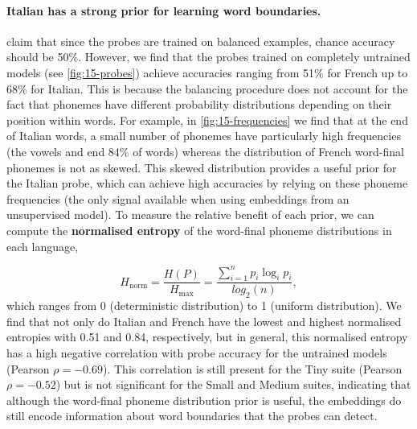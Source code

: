 \paragraph{Italian has a strong prior for learning word boundaries.}
\citet{hahn-baroni-2019-tabula} claim that since the probes are trained on balanced examples,
chance accuracy should be 50\%. However, we find that the probes trained on completely untrained models (see \cref{fig:15-probes}) achieve accuracies ranging from 51\% for French up to 68\% for Italian. This is because the balancing procedure does not account for the fact that phonemes have different probability distributions depending on their position within words. For example, in \cref{fig:15-frequencies} we find that at the end of Italian words, a small number of phonemes have particularly high frequencies (the vowels  and  end 84\% of words) whereas the distribution of French word-final phonemes is not as skewed. This skewed distribution provides a useful prior for the Italian probe, which can achieve high accuracies by relying on these phoneme frequencies (the only signal available when using embeddings from an unsupervised model). To measure the relative benefit of each prior, we can compute the \textbf{normalised entropy} of the word-final phoneme distributions in each language, 

$$H_\mathrm{norm}=\frac{H(P)}{H_\mathrm{max}} = \frac{\sum_{i=1}^np_i\log_ip_i}{log_2(n)},$$ 
which ranges from 0 (deterministic distribution) to 1 (uniform distribution). We find that not only do Italian and French have the lowest and highest normalised entropies with 0.51 and 0.84, respectively, but in general, this normalised entropy has a high negative correlation with probe accuracy for the untrained models (Pearson $\rho = -0.69$). This correlation is still present for the Tiny suite (Pearson $\rho = -0.52$) but is not significant for the Small and Medium suites, indicating that although the word-final phoneme distribution prior is useful, the embeddings do still encode information about word boundaries that the probes can detect.


